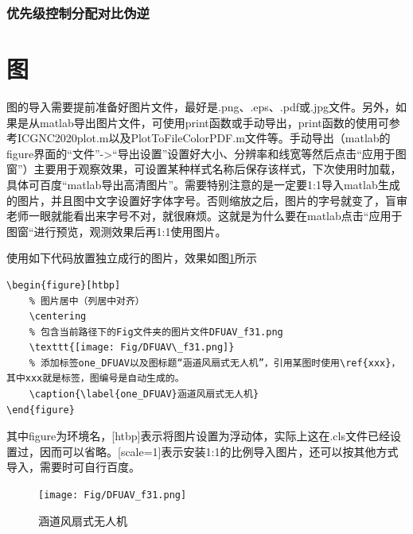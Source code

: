 \subsubsection{优先级控制分配对比伪逆}



\section{图}
图的导入需要提前准备好图片文件，最好是.png、.eps、.pdf或.jpg文件。另外，如果是从matlab导出图片文件，可使用print函数或手动导出，print函数的使用可参考ICGNC2020plot.m以及PlotToFileColorPDF.m文件等。手动导出（matlab的figure界面的“文件”->“导出设置”设置好大小、分辨率和线宽等然后点击“应用于图窗”）主要用于观察效果，可设置某种样式名称后保存该样式，下次使用时加载，具体可百度“matlab导出高清图片”。需要特别注意的是一定要1:1导入matlab生成的图片，并且图中文字设置好字体字号。否则缩放之后，图片的字号就变了，盲审老师一眼就能看出来字号不对，就很麻烦。这就是为什么要在matlab点击“应用于图窗“进行预览，观测效果后再1:1使用图片。

使用如下代码放置独立成行的图片，效果如图\ref{one_DFUAV}所示
\begin{lstlisting}
\begin{figure}[htbp]
	% 图片居中（列居中对齐）
	\centering	
	% 包含当前路径下的Fig文件夹的图片文件DFUAV_f31.png
	\texttt{[image: Fig/DFUAV\_f31.png]} 
	% 添加标签one_DFUAV以及图标题“涵道风扇式无人机”，引用某图时使用\ref{xxx}，其中xxx就是标签，图编号是自动生成的。
	\caption{\label{one_DFUAV}涵道风扇式无人机} 
\end{figure}
\end{lstlisting}
其中figure为环境名，[htbp]表示将图片设置为浮动体，实际上这在.cls文件已经设置过，因而可以省略。[scale=1]表示安装1:1的比例导入图片，还可以按其他方式导入，需要时可自行百度。
\begin{figure}[htbp]
	\centering
	\texttt{[image: Fig/DFUAV\_f31.png]}
	\caption{\label{one_DFUAV}涵道风扇式无人机}
\end{figure}

